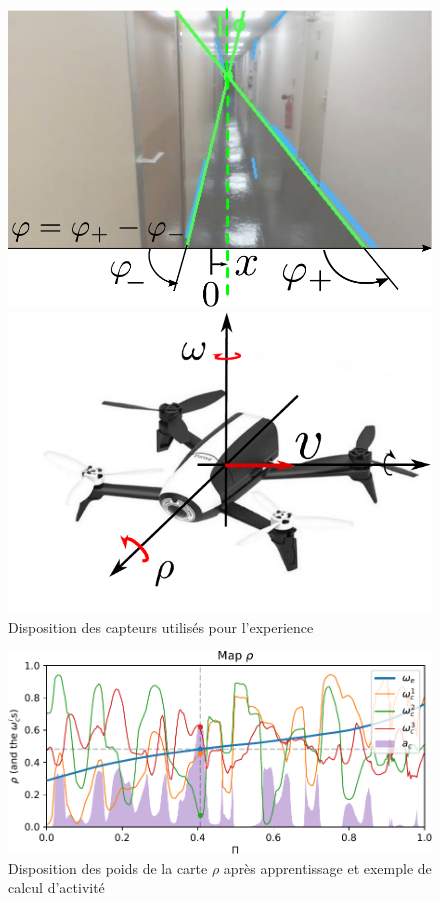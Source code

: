 \begin{figure}
\begin{minipage}{0.5\textwidth}
\includegraphics[width=\textwidth]{visudrone}
\end{minipage}
\begin{minipage}{0.5\textwidth}
\includegraphics[width=\textwidth]{dronesteup}
\end{minipage}
\caption{Disposition des capteurs utilisés pour l'experience}
\label{fig:drone}
\end{figure}

\begin{figure}
\includegraphics[width=\textwidth]{dronemap}
\caption{Disposition des poids de la carte $\rho$ après apprentissage et exemple de calcul d'activité}
\label{fig:drone_w}
\end{figure}

